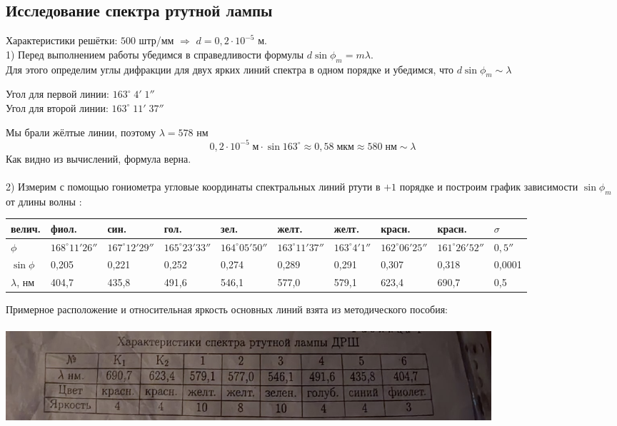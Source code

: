 \documentclass[a4paper]{article}
\begin{document}
\subsection{ Исследование спектра ртутной лампы}
Характеристики решётки: $500$ штр/мм $\Rightarrow$ $d = 0,2 \cdot 10^{-5}$ м.\\
1) Перед выполнением работы убедимся в справедливости формулы $d\sin \phi_m = m\lambda$.\\
Для этого определим углы дифракции для двух ярких линий спектра в одном порядке и убедимся, что $d\sin \phi_m  \sim \lambda$\\
\begin{center}
Угол для первой линии: $163^{\circ}\;4'\;1''$\\
Угол для второй линии: $163^{\circ}\;11'\;37''$\\
\end{center}
Мы брали жёлтые линии, поэтому $\lambda = 578$ нм\\
$$0,2 \cdot 10^{-5} \; \textit{м} \cdot \sin 163^{\circ} \approx 0,58 \; \textit{мкм} \approx 580 \; \textit{нм} \sim \lambda $$ 
Как видно из вычислений, формула верна.\\
\\
2) Измерим с помощью гониометра угловые координаты спектральных линий ртути в $+1$ порядке и построим график зависимости $\sin \phi_{m}$ от длины волны :
\tabcolsep=0.08cm
\begin{center}
\begin{tabular}{|l|l|l|l|l|l|l|l|l|l|}
\hline
велич. & фиол.&син.& гол. & зел. & желт. & желт. & красн. & красн. & $\sigma$\\
\hline
$\phi$&$168^{\circ}11'26''$ & $167^{\circ}12'29''$ & $165^{\circ}23'33''$ & $164^{\circ}05'50''$ & $163^{\circ}11'37''$ & $163^{\circ}4'1''$ & $162^{\circ}06'25''$ & $161^{\circ}26'52''$ & $0,5''$\\
\hline
$\sin \phi$ & 0,205 & 0,221 & 0,252 & 0,274 & 0,289 & 0,291 & 0,307 & 0,318 & 0,0001\\
\hline
$\lambda$, нм & 404,7 & 435,8 & 491,6 & 546,1 & 577,0 & 579,1 & 623,4 & 690,7 & 0,5 \\
\hline
\end{tabular}
\end{center}
Примерное расположение и относительная яркость основных линий взята из методического пособия:\\
\\
\includegraphics[width=18cm]{p1}\\
\end{document}
